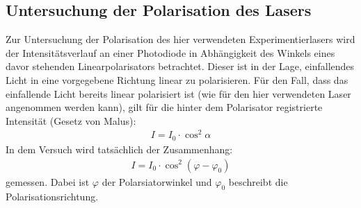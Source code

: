 \documentclass[11pt, a4paper]{article}
\numberwithin{equation}{section}
\begin{document}
\subsection{Untersuchung der Polarisation des Lasers}
\label{ssec:polarisation}
Zur Untersuchung der Polarisation des hier verwendeten Experimentierlasers wird der Intensitätsverlauf an einer Photodiode in Abhängigkeit des Winkels eines davor stehenden Linearpolarisators betrachtet.
Dieser ist in der Lage, einfallendes Licht in eine vorgegebene Richtung linear zu polarisieren.
Für den Fall, dass das einfallende Licht bereits linear polarisiert ist (wie für den hier verwendeten Laser angenommen werden kann), gilt für die hinter dem Polarisator registrierte Intensität (Gesetz von Malus):
\begin{align}
I=I_0\cdot\cos^2\alpha
\end{align}
In dem Versuch wird tatsächlich der Zusammenhang:
\begin{align}
	I = I_0 \cdot \cos^2 (\varphi - \varphi_0)
\end{align}
gemessen.
Dabei ist $\varphi$ der Polarsiatorwinkel und $\varphi_0$ beschreibt die Polarisationsrichtung. 
\end{document}
